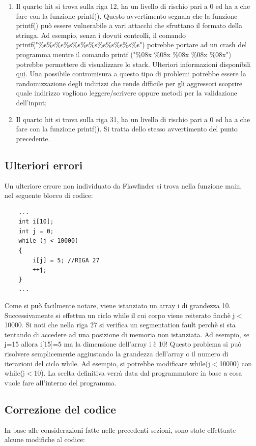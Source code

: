 \documentclass[11pt]{article} %
\begin{document}
\begin{enumerate}
\item{Il quarto hit si trova sulla riga 12, ha un livello di rischio pari a 0 ed ha a che fare con la funzione printf(). Questo avvertimento segnala che la funzione printf() può essere vulnerabile a vari attacchi che sfruttano il formato della stringa. Ad esempio, senza i dovuti controlli, il comando printf("\%s\%s\%s\%s\%s\%s\%s\%s\%s\%s\%s\%s") potrebbe portare ad un crash del programma mentre il comando printf ("\%08x \%08x \%08x \%08x \%08x") potrebbe permettere di visualizzare lo stack. Ulteriori informazioni disponibili \href{https://web.ecs.syr.edu/~wedu/Teaching/cis643/LectureNotes_New/Format_String.pdf}{qui}. Una possibile contromisura a questo tipo di problemi potrebbe essere la randomizzazione degli indirizzi che rende difficile per gli aggressori scoprire quale indirizzo vogliono leggere/scrivere oppure metodi per la validazione dell'input;}
\item{Il quarto hit si trova sulla riga 31, ha un livello di rischio pari a 0 ed ha a che fare con la funzione printf(). Si tratta dello stesso avvertimento del punto precedente.}
\end{enumerate}

\subsection{Ulteriori errori}
\label{sec:err}
Un ulteriore errore non individuato da Flawfinder si trova nella funzione main, nel seguente blocco di codice:
\begin{lstlisting}
	...
	int i[10];
	int j = 0;
	while (j < 10000)
	{
		i[j] = 5; //RIGA 27			 
		++j;
	}
	...
\end{lstlisting}
Come si può facilmente notare, viene istanziato un array i di grandezza 10. Successivamente si effettua un ciclo while il cui corpo viene reiterato finchè j$<$10000. Si noti che nella riga 27 si verifica un segmentation fault perchè si sta tentando di accedere ad una posizione di memoria non istanziata. Ad esempio, se j=15 allora i[15]=5 ma la dimensione dell'array i è 10! \newline
Questo problema si può risolvere semplicemente aggiustando la grandezza dell'array o il numero di iterazioni del ciclo while. Ad esempio, si potrebbe modificare while(j$<$10000) con while(j$<$10). La scelta definitiva verrà data dal programmatore in base a cosa vuole fare all'interno del programma.

\newpage

\subsection{Correzione del codice}
In base alle considerazioni fatte nelle precedenti sezioni, sono state effettuate alcune modifiche al codice:
\newline
\end{document}
